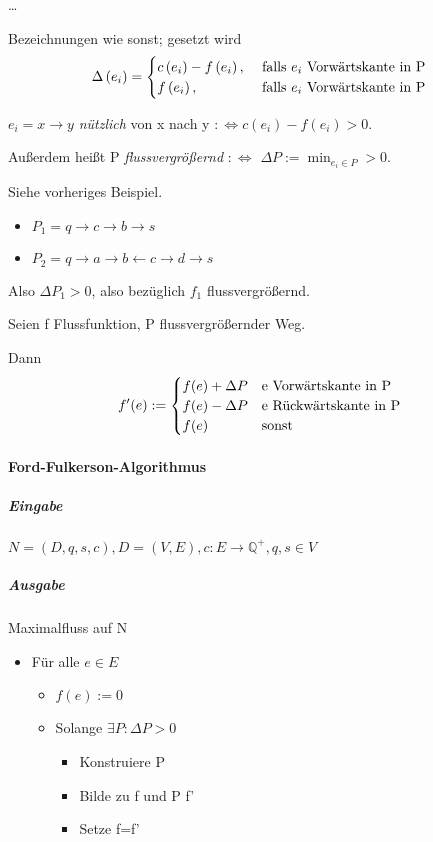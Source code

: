 \documentclass[10pt]{scrbook}
\begin{document}
\begin{Bsp}
\ldots
\end{Bsp}

\begin{Def}
Bezeichnungen wie sonst; gesetzt wird
\begin{displaymath}
\Delta\left(e_i\right)=
\begin{cases}
c\left(e_i\right)-f\left(e_i\right), & \textnormal{ falls $e_i$ Vorwärtskante in P} \\
f\left(e_i\right), & \textnormal{ falls $e_i$ Vorwärtskante in P}
\end{cases}
\end{displaymath}

$e_i=x\rightarrow y$ \emph{nützlich} von x nach y $:\Leftrightarrow c\left(e_i\right)-f\left(e_i\right)>0$.

Außerdem heißt P \emph{flussvergrößernd} $:\Leftrightarrow$ $\Delta P := \min_{e_i\in P} > 0$.
\end{Def}

\begin{Bsp}
Siehe vorheriges Beispiel.
\begin{itemize}
\item $P_1 = q\rightarrow c \rightarrow b \rightarrow s$
\item $P_2 = q\rightarrow a \rightarrow b \leftarrow c \rightarrow d \rightarrow s$
\end{itemize}
Also $\Delta P_1 > 0$, also bezüglich $f_1$ flussvergrößernd.
\end{Bsp}

\begin{Def}
Seien f Flussfunktion, P flussvergrößernder Weg.

Dann
\begin{displaymath}
f'(e):=
\begin{cases}
f(e)+\Delta P & \textnormal{e Vorwärtskante in P} \\
f(e)-\Delta P & \textnormal{e Rückwärtskante in P} \\
f(e) & \textnormal{sonst}
\end{cases}
\end{displaymath}
\end{Def}

\paragraph{Ford-Fulkerson-Algorithmus}
\subparagraph{Eingabe} $N=(D, q, s, c), D=(V, E), c: E\rightarrow \mathbb{Q}^+, q, s\in V$
\subparagraph{Ausgabe} Maximalfluss auf N
\begin{itemize}
\item Für alle $e\in E$
\begin{itemize}
\item $f(e):=0$
\item Solange $\exists P: \Delta P>0$
\begin{itemize}
\item Konstruiere P
\item Bilde zu f und P f'
\item Setze f=f'
\end{itemize}
\end{itemize}
\end{itemize}
\end{document}
